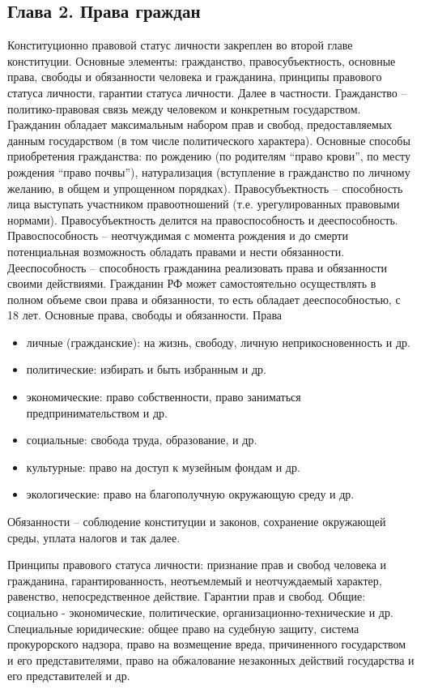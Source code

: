 \documentclass[a4paper, 12pt]{article}
\begin{document}
\subsection{Глава 2. Права граждан}
Конституционно правовой статус личности закреплен во второй главе конституции. Основные элементы: гражданство, правосубъектность, основные права, свободы и обязанности человека и гражданина, принципы правового статуса личности, гарантии статуса личности. Далее в частности. Гражданство -- политико-правовая связь между человеком и конкретным государством. Гражданин обладает максимальным набором прав и свобод, предоставляемых данным государством (в том числе политического характера). Основные способы приобретения гражданства: по рождению (по родителям ``право крови'', по месту рождения ``право почвы''), натурализация (вступление в гражданство по личному желанию, в общем и упрощенном порядках). Правосубъектность -- способность лица выступать участником правоотношений (т.е. урегулированных правовыми нормами). Правосубъектность делится на правоспособность и дееспособность. Правоспособность -- неотчуждимая с момента рождения и до смерти потенциальная возможность обладать правами и нести обязанности. Дееспособность -- способность гражданина реализовать права и обязанности своими действиями. Гражданин РФ может самостоятельно осуществлять в полном объеме свои права и обязанности, то есть обладает дееспособностью, с 18 лет. Основные права, свободы и обязанности. Права
\begin{itemize}
\item личные (гражданские): на жизнь, свободу, личную неприкосновенность и др.
\item политические: избирать и быть избранным и др.
\item экономические: право собственности, право заниматься предпринимательством и др. 
\item социальные: свобода труда, образование, и др.
\item культурные: право на доступ к музейным фондам и др. 
\item экологические: право на благополучную окружающую среду и др. 
\end{itemize}
Обязанности -- соблюдение конституции и законов, сохранение окружающей среды, уплата налогов и так далее. 

Принципы правового статуса личности: признание прав и свобод человека и гражданина, гарантированность, неотъемлемый и неотчуждаемый характер, равенство, непосредственное действие. Гарантии прав и свобод. Общие: социально\!\! -\!\! экономические, политические, организационно-технические и др. Специальные юридические: общее право на судебную защиту, система прокурорского надзора, право на возмещение вреда, причиненного государством и его представителями, право на обжалование незаконных действий государства и его представителей и др. 
\end{document}
